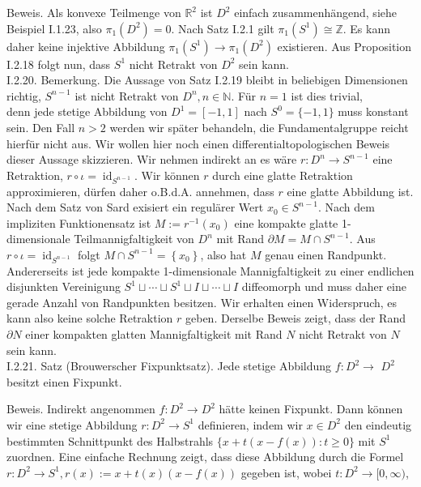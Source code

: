 \documentclass[10pt]{article}
\begin{document}
Beweis. Als konvexe Teilmenge von $\mathbb{R}^{2}$ ist $D^{2}$ einfach zusammenhängend, siehe Beispiel I.1.23, also $\pi_{1}\left(D^{2}\right)=0$. Nach Satz I.2.1 gilt $\pi_{1}\left(S^{1}\right) \cong \mathbb{Z}$. Es kann daher keine injektive Abbildung $\pi_{1}\left(S^{1}\right) \rightarrow \pi_{1}\left(D^{2}\right)$ existieren. Aus Proposition I.2.18 folgt nun, dass $S^{1}$ nicht Retrakt von $D^{2}$ sein kann.\\
I.2.20. Bemerkung. Die Aussage von Satz I.2.19 bleibt in beliebigen Dimensionen richtig, $S^{n-1}$ ist nicht Retrakt von $D^{n}, n \in \mathbb{N}$. Für $n=1$ ist dies trivial,\\
denn jede stetige Abbildung von $D^{1}=[-1,1]$ nach $S^{0}=\{-1,1\}$ muss konstant sein. Den Fall $n>2$ werden wir später behandeln, die Fundamentalgruppe reicht hierfür nicht aus. Wir wollen hier noch einen differentialtopologischen Beweis dieser Aussage skizzieren. Wir nehmen indirekt an es wäre $r: D^{n} \rightarrow S^{n-1}$ eine Retraktion, $r \circ \iota=\operatorname{id}_{S^{n-1}}$. Wir können $r$ durch eine glatte Retraktion approximieren, dürfen daher o.B.d.A. annehmen, dass $r$ eine glatte Abbildung ist. Nach dem Satz von Sard exisiert ein regulärer Wert $x_{0} \in S^{n-1}$. Nach dem impliziten Funktionensatz ist $M:=r^{-1}\left(x_{0}\right)$ eine kompakte glatte 1-dimensionale Teilmannigfaltigkeit von $D^{n}$ mit Rand $\partial M=M \cap S^{n-1}$. Aus $r \circ \iota=\operatorname{id}_{S^{n-1}}$ folgt $M \cap S^{n-1}=\left\{x_{0}\right\}$, also hat $M$ genau einen Randpunkt. Andererseits ist jede kompakte 1-dimensionale Mannigfaltigkeit zu einer endlichen disjunkten Vereinigung $S^{1} \sqcup \cdots \sqcup S^{1} \sqcup I \sqcup \cdots \sqcup I$ diffeomorph und muss daher eine gerade Anzahl von Randpunkten besitzen. Wir erhalten einen Widerspruch, es kann also keine solche Retraktion $r$ geben. Derselbe Beweis zeigt, dass der Rand $\partial N$ einer kompakten glatten Mannigfaltigkeit mit Rand $N$ nicht Retrakt von $N$ sein kann.\\
I.2.21. Satz (Brouwerscher Fixpunktsatz). Jede stetige Abbildung $f: D^{2} \rightarrow$ $D^{2}$ besitzt einen Fixpunkt.

Beweis. Indirekt angenommen $f: D^{2} \rightarrow D^{2}$ hätte keinen Fixpunkt. Dann können wir eine stetige Abbildung $r: D^{2} \rightarrow S^{1}$ definieren, indem wir $x \in D^{2}$ den eindeutig bestimmten Schnittpunkt des Halbstrahls $\{x+t(x-f(x)): t \geq 0\}$ mit $S^{1}$ zuordnen. Eine einfache Rechnung zeigt, dass diese Abbildung durch die Formel $r: D^{2} \rightarrow S^{1}, r(x):=x+t(x)(x-f(x))$ gegeben ist, wobei $t: D^{2} \rightarrow[0, \infty)$,
\end{document}
